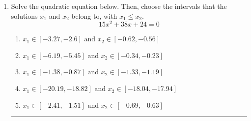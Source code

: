 \documentclass[14pt]{extbook}
\newcommand{\litem}[1]{\item#1\hspace*{-1cm}\rule{\textwidth}{0.4pt}}
\begin{document}
\begin{enumerate}
{\begin{enumerate}[label=\Alph*.]
\end{enumerate} }
\litem{
Solve the quadratic equation below. Then, choose the intervals that the solutions $x_1$ and $x_2$ belong to, with $x_1 \leq x_2$.\[ 15x^{2} +38 x + 24 = 0 \]\begin{enumerate}[label=\Alph*.]
\item \( x_1 \in [-3.27, -2.6] \text{ and } x_2 \in [-0.62, -0.56] \)
\item \( x_1 \in [-6.19, -5.45] \text{ and } x_2 \in [-0.34, -0.23] \)
\item \( x_1 \in [-1.38, -0.87] \text{ and } x_2 \in [-1.33, -1.19] \)
\item \( x_1 \in [-20.19, -18.82] \text{ and } x_2 \in [-18.04, -17.94] \)
\item \( x_1 \in [-2.41, -1.51] \text{ and } x_2 \in [-0.69, -0.63] \)


\end{enumerate}}
\end{enumerate}
\end{document}
